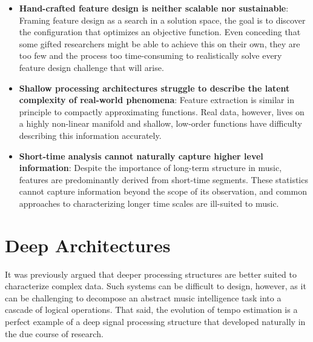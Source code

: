 \begin{itemize}

\item \textbf{Hand-crafted feature design is neither scalable nor sustainable}: Framing feature design as a search in a solution space, the goal is to discover the configuration that optimizes an objective function. Even conceding that some gifted researchers might be able to achieve this on their own, they are too few and the process too time-consuming to realistically solve every feature design challenge that will arise. \\
\item \textbf{Shallow processing architectures struggle to describe the latent complexity of real-world phenomena}: Feature extraction is similar in principle to compactly approximating functions. Real data, however, lives on a highly non-linear manifold and shallow, low-order functions have difficulty describing this information accurately. \\
\item \textbf{Short-time analysis cannot naturally capture higher level information}: Despite the importance of long-term structure in music, features are predominantly derived from short-time segments. These statistics cannot capture information beyond the scope of its observation, and common approaches to characterizing longer time scales are ill-suited to music.\\

\end{itemize}


\section{Deep Architectures}

It was previously argued that deeper processing structures are better suited to characterize complex data.
Such systems can be difficult to design, however, as it can be challenging to decompose an abstract music intelligence task into a cascade of logical operations.
That said, the evolution of tempo estimation is a perfect example of a deep signal processing structure that developed naturally in the due course of research.

